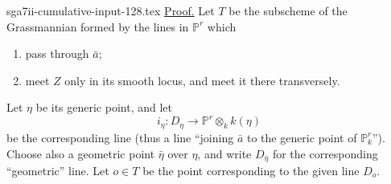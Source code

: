 \begin{filecontents*}{sga7ii-cumulative-input-128.tex}
\underline{Proof.}
Let $T$ be the subscheme of the Grassmannian formed by the lines in
$\mathbb P^r$ which
\begin{enumerate}[label=(\roman*)]
\item pass through $\bar a$;
\item meet $Z$ only in its smooth locus, and meet it there transversely.
\end{enumerate}
Let $\eta$ be its generic point, and let
\[
i_\eta:D_\eta\longrightarrow\mathbb P^r\otimes_k k(\eta)
\]
be the corresponding line (thus a line ``joining $\bar a$ to the generic
point of $\mathbb P^r_k$'').  Choose also a geometric point $\bar\eta$ over
$\eta$, and write $D_{\bar\eta}$ for the corresponding ``geometric'' line.
Let $o\in T$ be the point corresponding to the given line $D_o$.
\end{filecontents*}
